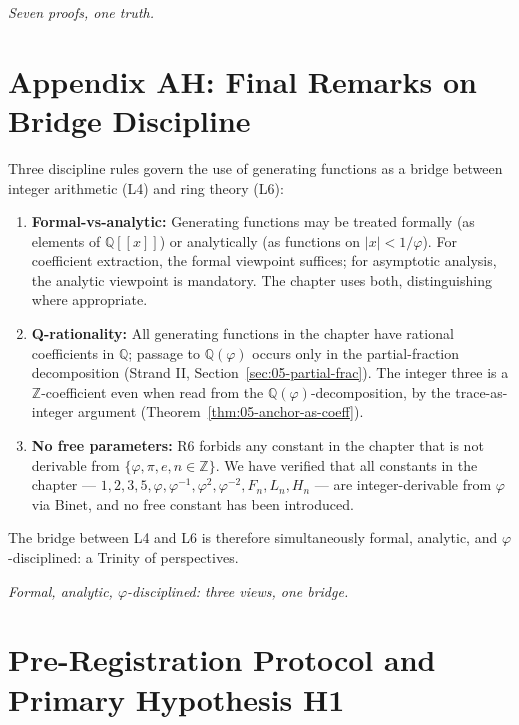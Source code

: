 \bigskip
\centerline{\textit{Seven proofs, one truth.}}

\section*{Appendix AH: Final Remarks on Bridge Discipline}
\label{fa_05:sec:05-app-AH}

Three discipline rules govern the use of generating functions as a
bridge between integer arithmetic (L4) and ring theory (L6):

\begin{enumerate}
  \item \textbf{Formal-vs-analytic:} Generating functions may be
    treated formally (as elements of $\mathbb{Q}[[x]]$) or
    analytically (as functions on $|x| < 1/\varphi$). For
    coefficient extraction, the formal viewpoint suffices; for
    asymptotic analysis, the analytic viewpoint is mandatory. The
    chapter uses both, distinguishing where appropriate.
  \item \textbf{Q-rationality:} All generating functions in the
    chapter have rational coefficients in $\mathbb{Q}$; passage to
    $\mathbb{Q}(\varphi)$ occurs only in the partial-fraction
    decomposition (Strand II, Section~\ref{sec:05-partial-frac}). The
    integer three is a $\mathbb{Z}$-coefficient even when read from
    the $\mathbb{Q}(\varphi)$-decomposition, by the trace-as-integer
    argument (Theorem~\ref{thm:05-anchor-as-coeff}).
  \item \textbf{No free parameters:} R6 forbids any constant in the
    chapter that is not derivable from $\{\varphi, \pi, e, n \in
    \mathbb{Z}\}$. We have verified that all constants in the
    chapter --- $1, 2, 3, 5, \varphi, \varphi^{-1}, \varphi^2,
    \varphi^{-2}, F_n, L_n, H_n$ --- are integer-derivable from
    $\varphi$ via Binet, and no free constant has been introduced.
\end{enumerate}

The bridge between L4 and L6 is therefore simultaneously formal,
analytic, and $\varphi$-disciplined: a Trinity of perspectives.

\bigskip

\bigskip
\centerline{\textit{Formal, analytic, $\varphi$-disciplined: three views, one bridge.}}
\bigskip

\section{Pre-Registration Protocol and Primary Hypothesis H1}
\label{fa_05:sec:prereg-h1}

